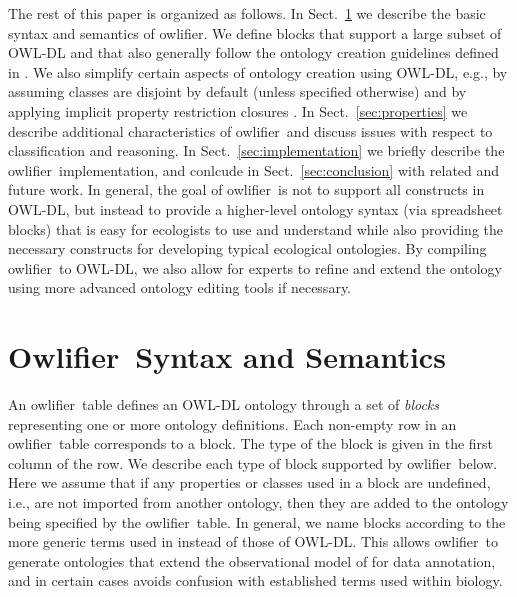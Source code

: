 \documentclass[preprint,number]{elsarticle}
\newcommand{\Owlifier}{\textsf{Owlifier}}
\newcommand{\owlifier}{\textsf{owlifier}}
\newcommand{\secref}[1]{Sect.~\ref{#1}}
\begin{document}
The rest of this paper is organized as follows. In
\secref{sec:owlifier} we describe the basic syntax and semantics of
\owlifier. We define blocks that support a large subset of OWL-DL and
that also generally follow the ontology creation guidelines defined in
\cite{rector04:_owl_pizzas}. We also simplify certain aspects of
ontology creation using OWL-DL, e.g., by assuming classes are disjoint
by default (unless specified otherwise) and by applying implicit
property restriction closures \cite{rector04:_owl_pizzas}. In
\secref{sec:properties} we describe additional characteristics of
\owlifier\ and discuss issues with respect to classification and
reasoning. In \secref{sec:implementation} we briefly describe the
\owlifier\ implementation, and conlcude in \secref{sec:conclusion}
with related and future work. In general, the goal of \owlifier\ is
not to support all constructs in OWL-DL, but instead to provide a
higher-level ontology syntax (via spreadsheet blocks) that is easy for
ecologists to use and understand while also providing the necessary
constructs for developing typical ecological ontologies. By compiling
\owlifier\ to OWL-DL, we also allow for experts to refine and extend
the ontology using more advanced ontology editing tools if necessary.



\section{\Owlifier\ Syntax and Semantics}
\label{sec:owlifier}

An \owlifier\ table defines an OWL-DL
\cite{smith04:_owl_web_ontol_languag_guide} ontology through a set of
\emph{blocks} representing one or more ontology definitions.  Each
non-empty row in an \owlifier\ table corresponds to a block. The type
of the block is given in the first column of the row. We describe each
type of block supported by \owlifier\ below. Here we assume that if
any properties or classes used in a block are undefined, i.e., are not
imported from another ontology, then they are added to the ontology
being specified by the \owlifier\ table. In general, we name blocks
according to the more generic terms used in
\cite{bowers08:_concep_model_framew_for_expres,madina07:_ontol_for_descr_and_synth}
instead of those of OWL-DL. This allows \owlifier\ to generate
ontologies that extend the observational model of
\cite{bowers08:_concep_model_framew_for_expres,madina07:_ontol_for_descr_and_synth}
for data annotation, and in certain cases avoids confusion with
established terms used within biology.
\end{document}

